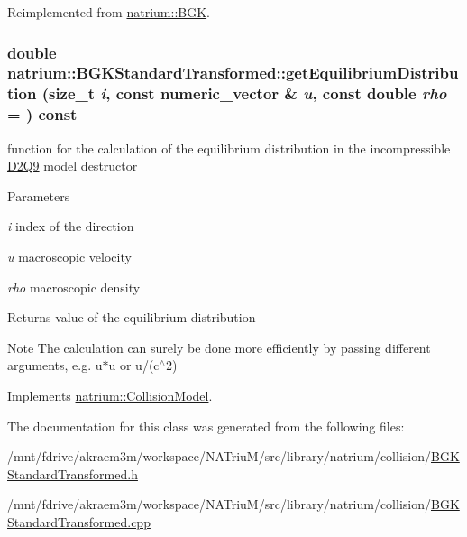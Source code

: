 Reimplemented from \hyperlink{classnatrium_1_1BGK_a9fa1c980217a183fc4762954e86ba36d}{natrium::BGK}.\hypertarget{classnatrium_1_1BGKStandardTransformed_a870465cc026f92c8ffba899af6f95634}{
\subsubsection[{getEquilibriumDistribution}]{\setlength{\rightskip}{0pt plus 5cm}double natrium::BGKStandardTransformed::getEquilibriumDistribution (size\_\-t {\em i}, \/  const {\bf numeric\_\-vector} \& {\em u}, \/  const double {\em rho} = {}) const}}
\label{classnatrium_1_1BGKStandardTransformed_a870465cc026f92c8ffba899af6f95634}


function for the calculation of the equilibrium distribution in the incompressible \hyperlink{classnatrium_1_1D2Q9}{D2Q9} model destructor


\begin{DoxyParams}{Parameters}
\item[{\em i}]index of the direction \item[{\em u}]macroscopic velocity \item[{\em rho}]macroscopic density \end{DoxyParams}
\begin{DoxyReturn}{Returns}
value of the equilibrium distribution 
\end{DoxyReturn}
\begin{DoxyNote}{Note}
The calculation can surely be done more efficiently by passing different arguments, e.g. u$\ast$u or u/(c$^\wedge$2) 
\end{DoxyNote}


Implements \hyperlink{classnatrium_1_1CollisionModel_a88b382d63da80e950bc58e8afad769a6}{natrium::CollisionModel}.

The documentation for this class was generated from the following files:\begin{DoxyCompactItemize}
\item 
/mnt/fdrive/akraem3m/workspace/NATriuM/src/library/natrium/collision/\hyperlink{BGKStandardTransformed_8h}{BGKStandardTransformed.h}\item 
/mnt/fdrive/akraem3m/workspace/NATriuM/src/library/natrium/collision/\hyperlink{BGKStandardTransformed_8cpp}{BGKStandardTransformed.cpp}\end{DoxyCompactItemize}
